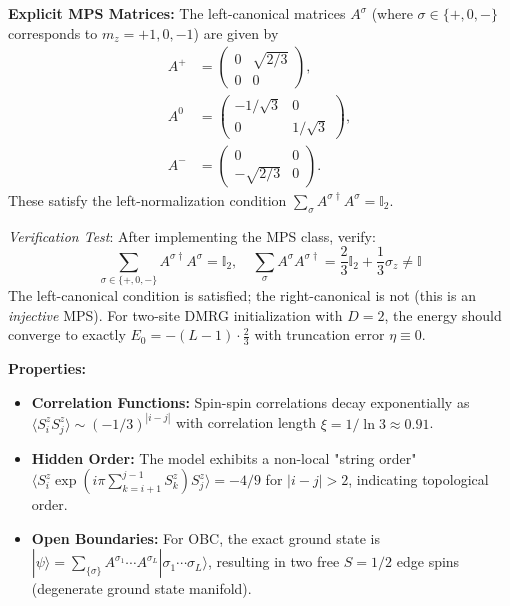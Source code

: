 \documentclass[aps,prb,onecolumn,scriptaddress]{revtex4-2}
\newcommand{\ket}[1]{|#1\rangle}
\begin{document}
	\textbf{Explicit MPS Matrices:} The left-canonical matrices $A^{\sigma}$ (where $\sigma \in \{+,0,-\}$ corresponds to $m_z = +1, 0, -1$) are given by
	\begin{align}
		A^{+} &= \begin{pmatrix} 0 & \sqrt{2/3} \\ 0 & 0 \end{pmatrix}, \\
		A^{0} &= \begin{pmatrix} -1/\sqrt{3} & 0 \\ 0 & 1/\sqrt{3} \end{pmatrix}, \\
		A^{-} &= \begin{pmatrix} 0 & 0 \\ -\sqrt{2/3} & 0 \end{pmatrix}.
	\end{align}
	These satisfy the left-normalization condition $\sum_{\sigma} A^{\sigma\dagger} A^{\sigma} = \mathbb{I}_2$.
	
	\textit{Verification Test}: After implementing the MPS class, verify:
	\begin{equation}
		\sum_{\sigma \in \{+,0,-\}} A^{\sigma\dagger} A^{\sigma} = \mathbb{I}_2, \quad 
		\sum_{\sigma} A^{\sigma} A^{\sigma\dagger} = \frac{2}{3}\mathbb{I}_2 + \frac{1}{3}\sigma_z \neq \mathbb{I}
	\end{equation}
	The left-canonical condition is satisfied; the right-canonical is not (this is an \textit{injective} MPS). For two-site DMRG initialization with $D=2$, the energy should converge to exactly $E_0 = -(L-1)\cdot \frac{2}{3}$ with truncation error $\eta \equiv 0$.
	
	\textbf{Properties:}
	\begin{itemize}
		\item \textbf{Correlation Functions:} Spin-spin correlations decay exponentially as $\langle S^z_i S^z_j \rangle \sim (-1/3)^{|i-j|}$ with correlation length $\xi = 1/\ln 3 \approx 0.91$.
		\item \textbf{Hidden Order:} The model exhibits a non-local "string order" $\langle S^z_i \exp(i\pi \sum_{k=i+1}^{j-1} S^z_k) S^z_j \rangle = -4/9$ for $|i-j|>2$, indicating topological order.
		\item \textbf{Open Boundaries:} For OBC, the exact ground state is $\ket{\psi} = \sum_{\{\sigma\}} A^{\sigma_1} \cdots A^{\sigma_L} \ket{\sigma_1 \cdots \sigma_L}$, resulting in two free $S=1/2$ edge spins (degenerate ground state manifold).
	\end{itemize}
	
\end{document}
